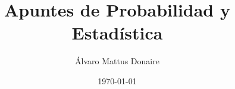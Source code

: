 \documentclass[a5paper, %
	fontsize=10pt, %
	twoside=false, %
]{kaobook}
\begin{document}
\titlehead{Apuntes de Probabilidad y Estadística} %


\title[Apuntes de Probabilidad y Estadística]{Apuntes de Probabilidad y Estadística}


\author[AMD]{Álvaro Mattus Donaire}

\date{\today}

\publishers{Notas personales}
\frontmatter %
\maketitle %


\tableofcontents %

\mainmatter %




















\end{document}

